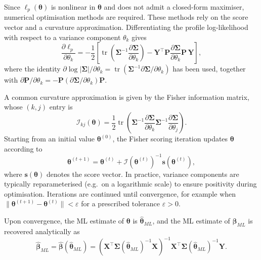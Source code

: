 \documentclass[
  letterpaper,
  DIV=11,
  numbers=noendperiod]{scrartcl}
\begin{document}
Since \(\ell_p(\symbf{\theta})\) is nonlinear in \(\symbf{\theta}\) and
does not admit a closed-form maximiser, numerical optimisation methods
are required. These methods rely on the score vector and a curvature
approximation. Differentiating the profile log-likelihood with respect
to a variance component \(\theta_k\) gives \begin{equation}
\frac{\partial \ell_p}{\partial \theta_k}
=
-\frac{1}{2}\left[
\operatorname{tr}\!\left(
\symbf{\Sigma}^{-1}\frac{\partial \symbf{\Sigma}}{\partial \theta_k}
\right)
-
\symbf{Y}^\top \symbf{P}
\frac{\partial \symbf{\Sigma}}{\partial \theta_k}
\symbf{P}\,\symbf{Y}
\right],
\end{equation} where the identity
\(\partial \log|\symbf{\Sigma}|/\partial \theta_k
=
\operatorname{tr}(\symbf{\Sigma}^{-1}\partial \symbf{\Sigma}/\partial \theta_k)\)
has been used, together with \(\partial \symbf{P}/\partial \theta_k
=
-\symbf{P}(\partial \symbf{\Sigma}/\partial \theta_k)\symbf{P}\).

A common curvature approximation is given by the Fisher information
matrix, whose \((k,j)\) entry is \begin{equation}
\mathcal{I}_{kj}(\symbf{\theta})
=
\frac{1}{2}\operatorname{tr}\!\left(
\symbf{\Sigma}^{-1}\frac{\partial\symbf{\Sigma}}{\partial\theta_k}
\symbf{\Sigma}^{-1}\frac{\partial\symbf{\Sigma}}{\partial\theta_j}
\right).
\end{equation} Starting from an initial value \(\symbf{\theta}^{(0)}\),
the Fisher scoring iteration updates \(\symbf{\theta}\) according to
\begin{equation}
\symbf{\theta}^{(t+1)}
=
\symbf{\theta}^{(t)}
+
\mathcal{I}\!\left(\symbf{\theta}^{(t)}\right)^{-1}
\symbf{s}\!\left(\symbf{\theta}^{(t)}\right),
\end{equation} where \(\symbf{s}(\symbf{\theta})\) denotes the score
vector. In practice, variance components are typically reparameterised
(e.g.~on a logarithmic scale) to ensure positivity during optimisation.
Iterations are continued until convergence, for example when
\(\|\symbf{\theta}^{(t+1)} - \symbf{\theta}^{(t)}\| < \varepsilon\) for
a prescribed tolerance \(\varepsilon > 0\).

Upon convergence, the ML estimate of \(\symbf{\theta}\) is
\(\widehat{\symbf{\theta}}_{ML}\), and the ML estimate of
\(\symbf{\beta}_{ML}\) is recovered analytically as \begin{equation}
    \widehat{\symbf{\beta}}_{ML}
    = \widehat{\symbf{\beta}}\!\left(\widehat{\symbf{\theta}}_{ML}\right)
    =
    \left(
        \symbf{X}^\top
        \symbf{\Sigma}(\widehat{\symbf{\theta}}_{ML})^{-1}
        \symbf{X}
    \right)^{-1}
    \symbf{X}^\top
    \symbf{\Sigma}(\widehat{\symbf{\theta}}_{ML})^{-1}
    \symbf{Y}.
\end{equation}
\end{document}
